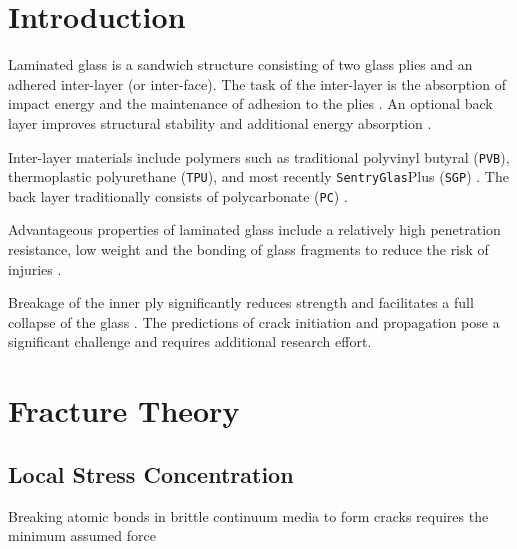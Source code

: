 \documentclass[format=acmtog, 12pt, screen=true, review=false]{acmart}
\begin{document}
\maketitle

\section{Introduction}

Laminated glass is a sandwich structure consisting of two glass plies and an adhered inter-layer (or inter-face). The task of the inter-layer is the absorption of impact energy and the maintenance of adhesion to the plies \cite{Wu14}. An optional back layer improves structural stability and additional energy absorption \cite{Bio10, Bra10}.

\bigbreak
Inter-layer materials include polymers such as traditional polyvinyl butyral (\texttt{PVB}), thermoplastic polyurethane (\texttt{TPU}), and most recently \texttt{SentryGlas}\textregistered Plus (\texttt{SGP}) \cite{Moh18, Wan18}. The back layer traditionally consists of polycarbonate (\texttt{PC}) \cite{Mon04, Bra10}.

\bigbreak
Advantageous properties of laminated glass include a relatively high penetration resistance, low weight \cite{Wu14} and the bonding of glass fragments to reduce the risk of injuries \cite{Che17, Flo98, Ji98}. 

\bigbreak
Breakage of the inner ply significantly reduces strength and facilitates a full collapse of the glass \cite{Flo98}. The predictions of crack initiation and propagation pose a significant challenge and requires additional research effort.

\section{Fracture Theory}

\subsection{Local Stress Concentration}

Breaking atomic bonds in brittle continuum media to form cracks requires the minimum assumed force
\end{document}
